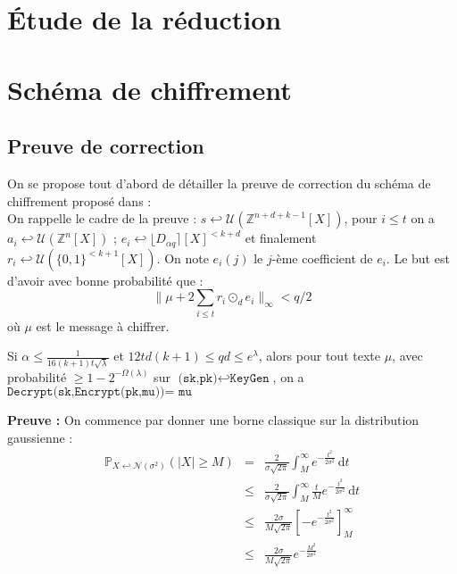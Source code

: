 \documentclass[11pt,a4paper]{article}
\begin{document}
\begin{th}

\section{Étude de la réduction}

\section{Schéma de chiffrement}

\subsection{Preuve de correction}

On se propose tout d'abord de détailler la preuve de correction du schéma de chiffrement proposé dans \cite{mplwe} : \\

On rappelle le cadre de la preuve : $s \hookleftarrow \mathcal{U}(\mathbb{Z}^{n+d+k-1}[X])$, pour $i\leq t$ on a $a_i \hookleftarrow \mathcal{U}(\mathbb{Z}^n[X])$ ; $e_i \hookleftarrow \lfloor D_{\alpha q}\rceil[X]^{<k+d}$ et finalement $r_i \hookleftarrow \mathcal{U}(\{0,1\}^{<k+1}[X])$. On note $e_i(j)$ le $j$-ème coefficient de $e_i$. Le but est d'avoir avec bonne probabilité que : 
\[\|\mu + 2\sum_{i \leq t}r_i \odot_d e_i  \|_\infty < q/2 \] où $\mu$ est le message à chiffrer. 
\begin{theorem}
Si $\alpha \leq \frac{1}{16(k+1)t\sqrt{\lambda}}$ et  $12td(k+1)\leq qd\leq e^\lambda$, alors pour tout texte $\mu$, avec probabilité $\geq 1 - 2^{-\Omega(\lambda)}$ sur $\texttt{(sk,pk)}\hookleftarrow\texttt{KeyGen} $, on a $\texttt{Decrypt(sk,Encrypt(pk,mu))= mu}$ 
\end{theorem}
\textbf{Preuve :}
On commence par donner une borne classique sur la distribution gaussienne : 
\begin{eqnarray*}
\mathbb{P}_{X \hookleftarrow \mathcal{N}(\sigma^2)}(|X| \geq M) &=& \frac{2}{\sigma \sqrt{2 \pi}} \int_{M}^\infty e^{-\frac{t^2}{2 \sigma^2}} \, \mathrm{d}t \\
&\leq &  \frac{2}{\sigma \sqrt{2 \pi}}\int_{M}^\infty \frac{t}{M} e^{-\frac{t^2}{2 \sigma^2}} \, \mathrm{d}t \\
& \leq & \frac{2\sigma}{M \sqrt{2 \pi}} [-e^{-\frac{t^2}{2 \sigma^2}}]_M^\infty \\
& \leq & \frac{2\sigma}{M \sqrt{2 \pi}} e^{-\frac{M^2}{2 \sigma^2}}
\end{eqnarray*}



\end{th}
\end{document}
